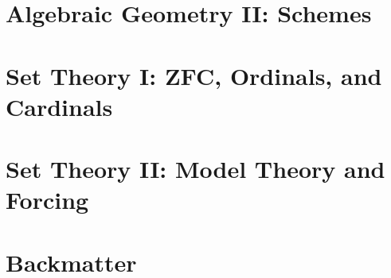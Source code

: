 \documentclass[11pt,numbers=noenddot]{scrreprt}
\begin{document}
\part{Algebraic Geometry II: Schemes}




\part{Set Theory I: ZFC, Ordinals, and Cardinals}





\part{Set Theory II: Model Theory and Forcing}




\part{Backmatter}
\appendix
{} %







\clearpage
\printbibliography[type=image,title={Image Attributions}]
\printbibliography[nottype=image]
\end{document}
